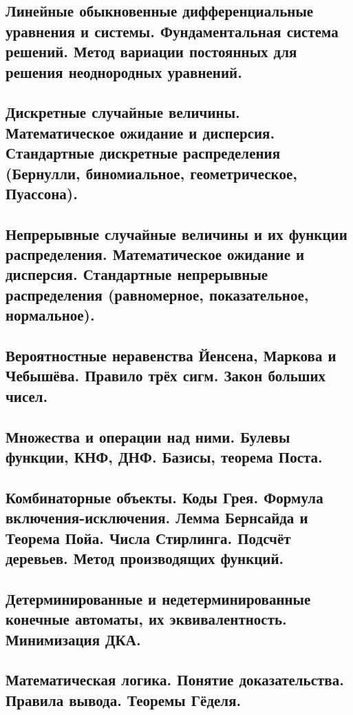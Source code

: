 \documentclass{article}
\begin{document}
	\subsection{Линейные обыкновенные дифференциальные уравнения и системы. Фундаментальная система решений. Метод вариации постоянных для решения неоднородных уравнений.}
	
	\subsection{Дискретные случайные величины. Математическое ожидание и дисперсия. Стандартные дискретные распределения (Бернулли, биномиальное, геометрическое, Пуассона).}
	
	\subsection{Непрерывные случайные величины и их функции распределения. Математическое ожидание и дисперсия. Стандартные непрерывные распределения (равномерное, показательное, нормальное).}
	
	\subsection{Вероятностные неравенства Йенсена, Маркова и Чебышёва. Правило трёх сигм. Закон больших чисел.}
	
	\subsection{Множества и операции над ними. Булевы функции, КНФ, ДНФ. Базисы, теорема Поста.}
	
	\subsection{Комбинаторные объекты. Коды Грея. Формула включения-исключения. Лемма Бернсайда и Теорема Пойа. Числа Стирлинга. Подсчёт деревьев. Метод производящих функций.}
	
	\subsection{Детерминированные и недетерминированные конечные автоматы, их эквивалентность. Минимизация ДКА.}
	
	\subsection{Математическая логика. Понятие доказательства. Правила вывода. Теоремы Гёделя.}
	
\end{document}
